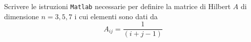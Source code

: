 Scrivere le istruzioni {\tt Matlab} necessarie per definire la matrice di Hilbert $A$ di dimensione $n=3,5,7$ i cui elementi sono dati da
\[  A_{ij}   =\frac{1}{(i+j-1)}    \]


